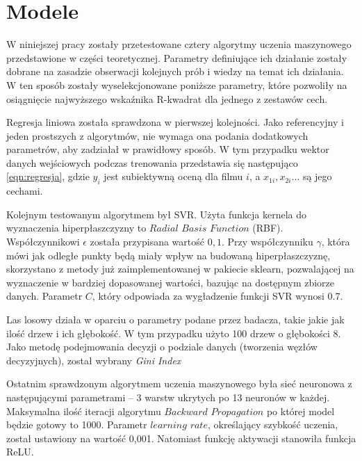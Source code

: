 \clearpage
\section{Modele }
\label{cha:drugiDokument}


W niniejszej pracy zostały przetestowane cztery algorytmy uczenia maszynowego przedstawione w części teoretycznej. Parametry definiujące ich działanie zostały dobrane na zasadzie obserwacji kolejnych prób i wiedzy na temat ich działania. W ten sposób zostały wyselekcjonowane poniższe parametry, które pozwoliły na osiągnięcie najwyższego wskaźnika R-kwadrat dla jednego z zestawów cech.  \par

Regresja liniowa została sprawdzona w pierwszej kolejności. Jako referencyjny i jeden prostszych z algorytmów, nie wymaga ona podania dodatkowych parametrów, aby zadziałał w prawidłowy sposób. W tym przypadku wektor danych wejściowych podczas trenowania przedstawia się  następująco \ref{eqn:regresja}, gdzie $y_i$ jest subiektywną oceną dla filmu $i$, a $x_{1i}, x_{2i}...$ są jego cechami. \par

Kolejnym testowanym algorytmem był SVR. Użyta funkcja kernela do wyznaczenia hiperpłaszczyzny to $Radial$ $Basis$ $Function$ (RBF). Współczynnikowi $\epsilon$ została przypisana wartość $0,1$. Przy współczynniku $\gamma$, która mówi jak odległe punkty będą miały wpływ na budowaną hiperpłaszczyznę, skorzystano z metody już zaimplementowanej w pakiecie sklearn, pozwalającej na wyznaczenie w bardziej dopasowanej wartości, bazując na dostępnym zbiorze danych. Parametr $C$, który odpowiada za wygładzenie funkcji SVR wynosi 0.7.\par

Las losowy działa w oparciu o parametry podane przez badacza, takie jakie jak ilość drzew i ich głębokość. W tym przypadku użyto 100 drzew o głębokości 8. Jako metodę podejmowania decyzji o podziale danych (tworzenia węzłów decyzyjnych), został wybrany \emph{Gini Index} \par

Ostatnim sprawdzonym algorytmem uczenia maszynowego była sieć neuronowa z następującymi parametrami -- 3 warstw ukrytych po 13 neuronów w każdej. Maksymalna ilość iteracji algorytmu $Backward$ $Propagation$ po której model będzie gotowy to 1000. Parametr $learning$ $rate$, określający szybkość uczenia, został ustawiony na wartość 0,001. Natomiast funkcję aktywacji stanowiła funkcja ReLU.\par





